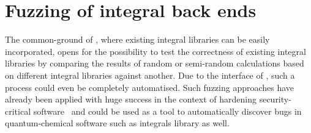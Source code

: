
\section{Fuzzing of integral back ends}
The common-ground \SCF of \molsturm, where existing integral libraries
can be easily incorporated,
opens for the possibility to test the correctness
of existing integral libraries by comparing the results of
random or semi-random \SCF calculations based on different integral libraries
against another.
Due to the \python interface of \molsturm, such a process could
even be completely automatised.
Such fuzzing approaches have already been applied with huge success
in the context of hardening security-critical software~\cite{Fuzzing}
and could be used as a tool to automatically discover bugs
in quantum-chemical software such as integrals library as well.
